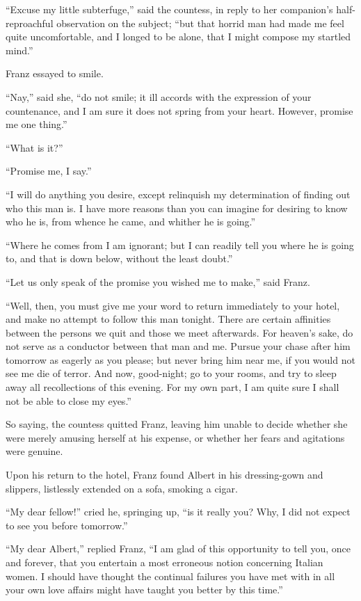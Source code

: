 “Excuse my little subterfuge,” said the countess, in reply to her
companion’s half-reproachful observation on the subject; “but that
horrid man had made me feel quite uncomfortable, and I longed to be
alone, that I might compose my startled mind.”

Franz essayed to smile.

“Nay,” said she, “do not smile; it ill accords with the expression of
your countenance, and I am sure it does not spring from your heart.
However, promise me one thing.”

“What is it?”

“Promise me, I say.”

“I will do anything you desire, except relinquish my determination of
finding out who this man is. I have more reasons than you can imagine
for desiring to know who he is, from whence he came, and whither he is
going.”

“Where he comes from I am ignorant; but I can readily tell you where he
is going to, and that is down below, without the least doubt.”

“Let us only speak of the promise you wished me to make,” said Franz.

“Well, then, you must give me your word to return immediately to your
hotel, and make no attempt to follow this man tonight. There are
certain affinities between the persons we quit and those we meet
afterwards. For heaven’s sake, do not serve as a conductor between that
man and me. Pursue your chase after him tomorrow as eagerly as you
please; but never bring him near me, if you would not see me die of
terror. And now, good-night; go to your rooms, and try to sleep away
all recollections of this evening. For my own part, I am quite sure I
shall not be able to close my eyes.”

So saying, the countess quitted Franz, leaving him unable to decide
whether she were merely amusing herself at his expense, or whether her
fears and agitations were genuine.

Upon his return to the hotel, Franz found Albert in his dressing-gown
and slippers, listlessly extended on a sofa, smoking a cigar.

“My dear fellow!” cried he, springing up, “is it really you? Why, I did
not expect to see you before tomorrow.”

“My dear Albert,” replied Franz, “I am glad of this opportunity to tell
you, once and forever, that you entertain a most erroneous notion
concerning Italian women. I should have thought the continual failures
you have met with in all your own love affairs might have taught you
better by this time.”

